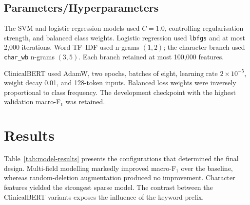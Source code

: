 \documentclass[twocolumn,10pt]{article}
\begin{document}
\subsection*{Parameters/Hyperparameters}

The SVM and logistic-regression models used \textbf{$C=1.0$},
controlling regularisation strength, and balanced class weights. Logistic regression used \texttt{lbfgs} and at most 2,000 iterations. Word TF--IDF used n-grams $(1,2)$; the character branch used \texttt{char\_wb} n-grams $(3,5)$. Each branch retained at most 100,000 features.

ClinicalBERT used AdamW, two epochs, batches of eight, learning rate $2\times10^{-5}$, weight decay 0.01, and 128-token inputs. Balanced loss weights were inversely proportional to class frequency. The development checkpoint with the highest validation macro-F$_1$ was retained.
\vspace{-0.5cm}

\section*{\vspace{-0.25cm}Results}

Table~\ref{tab:model-results} presents the configurations that determined the final design. Multi-field modelling markedly improved macro-F$_1$ over the baseline, whereas random-deletion augmentation produced no improvement. Character features yielded the strongest sparse model. The contrast between the ClinicalBERT variants exposes the influence of the keyword prefix.

\begin{table}[h]
\centering
\small
\setlength{\tabcolsep}{3pt}
\caption{Selected results on the 522-instance validation set.}
\label{tab:model-results}
\end{table}
\end{document}
